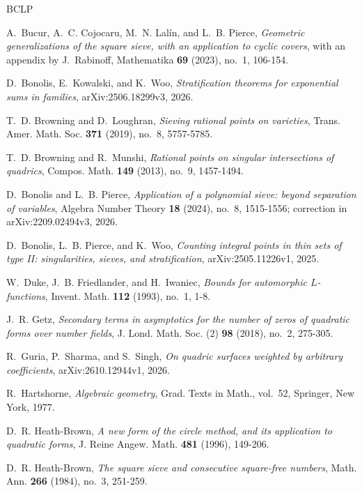\documentclass[11pt]{amsart}
\numberwithin{equation}{section}
\numberwithin{figure}{section}
\theoremstyle{definition}
\begin{document}
\begin{thebibliography}{BCLP}

A.~Bucur, A.~C. Cojocaru, M.~N. Lal\'in, and L.~B. Pierce,
\emph{Geometric generalizations of the square sieve, with an application to cyclic covers},
with an appendix by J.~Rabinoff,
Mathematika \textbf{69} (2023), no.~1, 106-154.

D.~Bonolis, E.~Kowalski, and K.~Woo,
\emph{Stratification theorems for exponential sums in families},
arXiv:2506.18299v3, 2026.

T.~D. Browning and D.~Loughran,
\emph{Sieving rational points on varieties},
Trans. Amer. Math. Soc. \textbf{371} (2019), no.~8, 5757-5785.

T.~D. Browning and R.~Munshi,
\emph{Rational points on singular intersections of quadrics},
Compos. Math. \textbf{149} (2013), no.~9, 1457-1494.

D.~Bonolis and L.~B. Pierce,
\emph{Application of a polynomial sieve: beyond separation of variables},
Algebra Number Theory \textbf{18} (2024), no.~8, 1515-1556;
correction in arXiv:2209.02494v3, 2026.

D.~Bonolis, L.~B. Pierce, and K.~Woo,
\emph{Counting integral points in thin sets of type II: singularities, sieves, and stratification},
arXiv:2505.11226v1, 2025.

W.~Duke, J.~B. Friedlander, and H.~Iwaniec,
\emph{Bounds for automorphic $L$-functions},
Invent. Math. \textbf{112} (1993), no.~1, 1-8.

J.~R. Getz,
\emph{Secondary terms in asymptotics for the number of zeros of quadratic forms over number fields},
J. Lond. Math. Soc. (2) \textbf{98} (2018), no.~2, 275-305.

R.~Guria, P.~Sharma, and S.~Singh,
\emph{On quadric surfaces weighted by arbitrary coefficients},
arXiv:2610.12944v1, 2026.

R.~Hartshorne,
\emph{Algebraic geometry},
Grad. Texts in Math., vol.~52, Springer, New York, 1977.

D.~R. Heath-Brown,
\emph{A new form of the circle method, and its application to quadratic forms},
J. Reine Angew. Math. \textbf{481} (1996), 149-206.

D.~R. Heath-Brown,
\emph{The square sieve and consecutive square-free numbers},
Math. Ann. \textbf{266} (1984), no.~3, 251-259.


\end{thebibliography}
\end{document}
